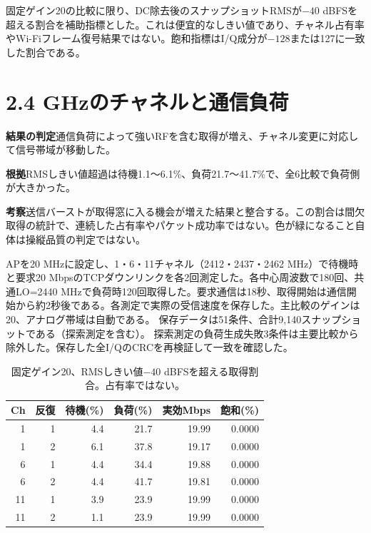 \documentclass[a4paper,10pt]{ltjsarticle}
\begin{document}
固定ゲイン20の比較に限り、DC除去後のスナップショットRMSが$-40$ dBFSを超える割合を補助指標とした。これは便宜的なしきい値であり、チャネル占有率やWi-Fiフレーム復号結果ではない。飽和指標はI/Q成分が$-128$または127に一致した割合である。

\section{2.4 GHzのチャネルと通信負荷}
\par\smallskip\noindent\textbf{結果の判定}\quad 通信負荷によって強いRFを含む取得が増え、チャネル変更に対応して信号帯域が移動した。

\noindent\textbf{根拠}\quad RMSしきい値超過は待機1.1〜6.1\%、負荷21.7〜41.7\%で、全6比較で負荷側が大きかった。

\noindent\textbf{考察}\quad 送信バーストが取得窓に入る機会が増えた結果と整合する。この割合は間欠取得の統計で、連続した占有率やパケット成功率ではない。色が緑になること自体は操縦品質の判定ではない。

APを20 MHzに設定し、1・6・11チャネル（2412・2437・2462 MHz）で待機時と要求20 MbpsのTCPダウンリンクを各2回測定した。各中心周波数で180回、共通LO=2440 MHzで負荷時120回取得した。要求通信は18秒、取得開始は通信開始から約2秒後である。各測定で実際の受信速度を保存した。主比較のゲインは20、アナログ帯域は自動である。
保存データは51条件、合計9,140スナップショットである（探索測定を含む）。
探索測定の負荷生成失敗3条件は主要比較から除外した。保存した全I/QのCRCを再検証して一致を確認した。

\begin{table}[htbp]\centering
\caption{固定ゲイン20、RMSしきい値$-40$ dBFSを超える取得割合。占有率ではない。}
\begin{tabular}{rrrrrr}
\toprule
Ch & 反復 & 待機(\%) & 負荷(\%) & 実効Mbps & 飽和(\%)\\\midrule
1 & 1 & 4.4 & 21.7 & 19.99 & 0.0000\\
1 & 2 & 6.1 & 37.8 & 19.17 & 0.0000\\
6 & 1 & 4.4 & 34.4 & 19.88 & 0.0000\\
6 & 2 & 4.4 & 41.7 & 19.81 & 0.0000\\
11 & 1 & 3.9 & 23.9 & 19.99 & 0.0000\\
11 & 2 & 1.1 & 23.9 & 19.99 & 0.0000\\
\bottomrule\end{tabular}\end{table}
\end{document}
